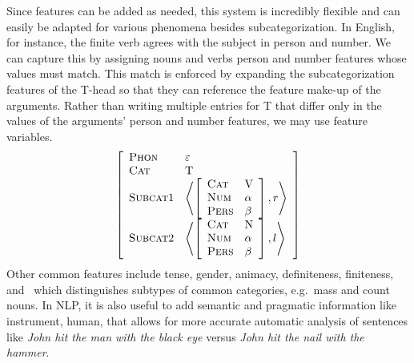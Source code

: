 Since features can be added as needed, this system is incredibly flexible and can easily be adapted for various phenomena besides subcategorization.
In English, for instance, the finite verb agrees with the subject in person and number.
We can capture this by assigning nouns and verbs person and number features whose values must match.
This match is enforced by expanding the subcategorization features of the T-head so that they can reference the feature make-up of the arguments.
Rather than writing multiple entries for T that differ only in the values of the arguments' person and number features, we may use feature variables.
%
\[
    \left [
        \begin{array}{ll}
            \text{\textsc{Phon}} & \varepsilon\\
            \text{\textsc{Cat}} & \text{T}\\
            \text{\textsc{Subcat}}1 & 
                \left \langle
                    \left [
                        \begin{array}{ll}
                            \text{\textsc{Cat}} & \text{V}\\
                            \text{\textsc{Num}} & \alpha\\
                            \text{\textsc{Pers}} & \beta\\
                        \end{array}
                    \right ]
                    ,
                    r
                \right \rangle
                \\
            \text{\textsc{Subcat}}2 & 
                \left \langle
                    \left [
                        \begin{array}{ll}
                            \text{\textsc{Cat}} & \text{N}\\
                            \text{\textsc{Num}} & \alpha\\
                            \text{\textsc{Pers}} & \beta\\
                        \end{array}
                    \right ]
                    ,
                    l
                \right \rangle
        \end{array}
    \right ]
\]
%
Other common features include tense, gender, animacy, definiteness, finiteness, and \Type\, which distinguishes subtypes of common categories, e.g.\ mass and count nouns.
In NLP, it is also useful to add semantic and pragmatic information like instrument, human, that allows for more accurate automatic analysis of sentences like \emph{John hit the man with the black eye} versus \emph{John hit the nail with the hammer}.

